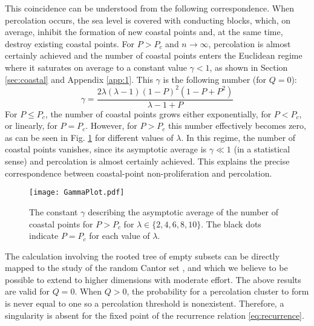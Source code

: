 \documentclass[amsmath,amssymb,amsfonts,aps,pre,preprint,superscriptaddress,bibnotes,showpacs,showkeys,longbibliography,nofootinbib]{revtex4-1}
\begin{document}
This coincidence can be understood from the following correspondence. When percolation occurs, the sea level is covered with conducting blocks, which, on average, inhibit the formation of new coastal points and, at the same time, destroy existing coastal points. For $P>P_c$ and $n\rightarrow\infty$, percolation is almost certainly achieved and the number of coastal points enters the Euclidean regime where it saturates on average to a constant value $\gamma <1$, as shown in Section \ref{sec:coastal} and Appendix \ref{app:1}. This $\gamma$ is the following number (for $Q=0$):
\begin{equation}
    \gamma =  \frac{2\lambda (\lambda-1) (1-P)^2 (1-P+P^2)}{\lambda-1+P}
\end{equation}
For $P\leq P_c$, the number of coastal points grows either exponentially, for  $P < P_c$, or linearly, for $P = P_c$. However, for $P>P_c$ this number effectively becomes zero, as can be seen in Fig. \ref{fig:gammaplot} for different values of $\lambda$. In this regime, the number of coastal points vanishes, since its asymptotic average is $\gamma\ll1$ (in a statistical sense) and percolation is almost certainly achieved. This explains the precise correspondence between coastal-point non-proliferation and percolation.

\begin{figure}[ht]
    \centering
    \texttt{[image: GammaPlot.pdf]}
    \caption{The constant $\gamma$ describing the asymptotic average of the number of coastal points for $P>P_c$ for $\lambda\in\{2,4,6,8,10\}$. The black dots indicate $P=P_c$ for each value of $\lambda$.}
    \label{fig:gammaplot}
\end{figure}

The calculation involving the rooted tree of empty subsets can be directly mapped to the study of the random Cantor set \cite{Falconer1994OnTG, Orzechowski1997}, and which we believe to be possible to extend to higher dimensions with moderate effort. The above results are valid for $Q=0$. When $Q>0$, the probability for a percolation cluster to form is never equal to one so a percolation threshold is nonexistent. Therefore, a singularity is absent for the fixed point of the recurrence relation \eqref{eq:recurrence}.
\end{document}
